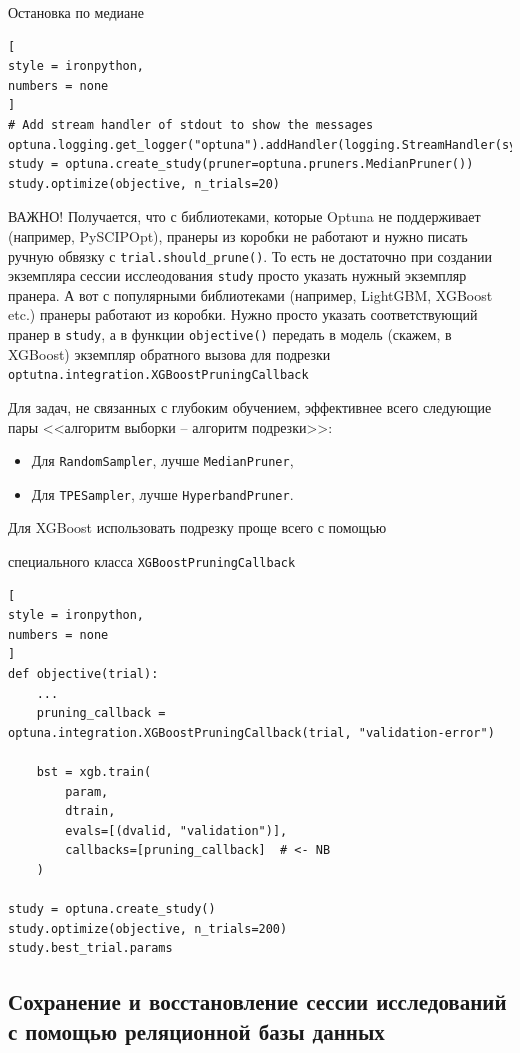 \documentclass[%
	11pt,
	a4paper,
	utf8,
		]{article}
\begin{document}
Остановка по медиане
\begin{lstlisting}[
style = ironpython,
numbers = none
]
# Add stream handler of stdout to show the messages
optuna.logging.get_logger("optuna").addHandler(logging.StreamHandler(sys.stdout))
study = optuna.create_study(pruner=optuna.pruners.MedianPruner())
study.optimize(objective, n_trials=20)
\end{lstlisting}

{\color{red}
ВАЖНО! Получается, что с библиотеками, которые Optuna не поддерживает (например, PySCIPOpt), пранеры из коробки не работают и нужно писать ручную обвязку с \verb|trial.should_prune()|. То есть не достаточно при создании экземпляра сессии исслеодования \verb|study| просто указать нужный экземпляр пранера. А вот с популярными библиотеками (например, LightGBM, XGBoost etc.) пранеры работают из коробки. Нужно просто указать соответствующий пранер в \verb|study|, а в функции \verb|objective()| передать в модель (скажем, в XGBoost) экземпляр обратного вызова для подрезки \verb|optutna.integration.XGBoostPruningCallback|
}

Для задач, не связанных с глубоким обучением, эффективнее всего следующие пары <<алгоритм выборки -- алгоритм подрезки>>:
\begin{itemize}
	\item Для \verb|RandomSampler|, лучше \verb|MedianPruner|,
	
	\item Для \verb|TPESampler|, лучше \verb|HyperbandPruner|.
\end{itemize}



Для XGBoost использовать подрезку проще всего с помощью 

специального класса \verb|XGBoostPruningCallback|
\begin{lstlisting}[
style = ironpython,
numbers = none
]
def objective(trial):
    ...
	pruning_callback = optuna.integration.XGBoostPruningCallback(trial, "validation-error")
	
	bst = xgb.train(
	    param,
	    dtrain,
	    evals=[(dvalid, "validation")],
	    callbacks=[pruning_callback]  # <- NB
	)
	
study = optuna.create_study()
study.optimize(objective, n_trials=200)
study.best_trial.params
\end{lstlisting}

\subsection{Сохранение и восстановление сессии исследований с помощью реляционной базы данных}
\end{document}
